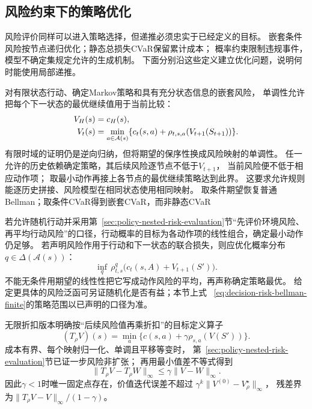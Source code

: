 \subsection{风险约束下的策略优化}
\label{sec:policy-risk-optimization}

风险评价同样可以进入策略选择，但递推必须忠实于已经定义的目标。
嵌套条件风险按节点递归优化；静态总损失CVaR保留累计成本；
概率约束限制违规事件，模型不确定集规定允许的生成机制。
下面分别沿这些定义建立优化问题，说明何时能使用局部递推。

对有限状态行动、确定Markov策略和具有充分状态信息的嵌套风险，
单调性允许把每个下一状态的最优继续值用于当前比较：
\begin{align}
  V_H(s)&=c_H(s),\notag\\
  V_t(s)&=\min_{a\in\mathcal A(s)}
    \{c_t(s,a)+\rho_{t,s,a}(V_{t+1}(S_{t+1}))\}.
  \label{eq:decision-risk-bellman-finite}
\end{align}
有限时域的证明仍是逆向归纳，但将期望的保序性换成风险映射的单调性。
任一允许的历史依赖确定策略，其后续风险逐节点不低于$V_{t+1}$，
当前风险便不低于相应动作项；
取最小动作再接上各节点的最优继续策略达到此界。
这要求允许规则能逐历史拼接、风险模型在相同状态使用相同映射。
取条件期望恢复普通Bellman；取条件CVaR得到嵌套CVaR，而非静态CVaR

若允许随机行动并采用第~\ref{sec:policy-nested-risk-evaluation}节“先评价环境风险、
再平均行动风险”的口径，行动概率的目标为各动作项的线性组合，确定最小动作仍足够。
若声明风险作用于行动和下一状态的联合损失，则应优化概率分布$q\in\Delta(\mathcal A(s))$：
\[
  \inf_q\,\rho^q_{t,s}\bigl(c_t(s,A)+V_{t+1}(S')\bigr).
\]
不能无条件用期望的线性性把它写成动作风险的平均，再声称确定策略最优。
给定更具体的风险泛函可另证随机化是否有益；本节上式
~\eqref{eq:decision-risk-bellman-finite}的策略范围以已声明的口径为准。

无限折扣版本明确按“后续风险值再乘折扣”的目标定义算子
\begin{equation}
  (T_\rho V)(s)=\min_a
    \{c(s,a)+\gamma\rho_{s,a}(V(S'))\}.
  \label{eq:decision-risk-bellman-operator}
\end{equation}
成本有界、每个映射归一化、单调且平移等变时，
第~\ref{sec:policy-nested-risk-evaluation}节已证一步风险非扩张；
再用最小值差不等式得到
\begin{equation}
  \lVert T_\rho V-T_\rho W\rVert_\infty
  \leq\gamma\lVert V-W\rVert_\infty.
  \label{eq:decision-risk-bellman-contraction}
\end{equation}
因此$\gamma<1$时唯一固定点存在，价值迭代误差不超过
$\gamma^k\lVert V^{(0)}-V^\star_\rho\rVert_\infty$，
残差界为$\lVert T_\rho V-V\rVert_\infty/(1-\gamma)$。


